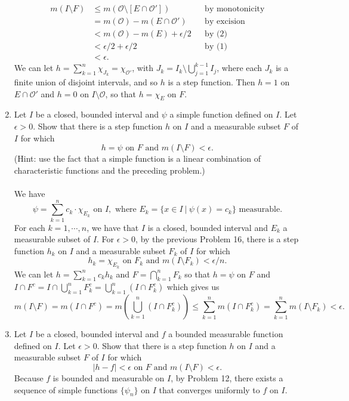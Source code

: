\begin{enumerate}
\begin{align*}
        m(I\setminus F)&\le m(\mathcal{O}\setminus[E\cap\mathcal{O}'])&&\text{by monotonicity}\\
        &=m(\mathcal{O})-m(E\cap\mathcal{O}')&&\text{by excision}\\
        &<m(\mathcal{O})-m(E)+\epsilon/2&&\text{by (2)}\\
        &<\epsilon/2+\epsilon/2&&\text{by (1)}\\\
        &<\epsilon.
    \end{align*}
    We can let $h=\sum_{k=1}^n \chi_{J_k}=\chi_{\mathcal{O}'}$, with $J_k=I_k\setminus\bigcup_{j=1}^{k-1}I_j$, where each $J_k$ is a finite union of disjoint intervals, and so $h$ is a step function.
    Then $h=1$ on $E\cap\mathcal{O}'$ and $h=0$ on $I\setminus\mathcal{O}$, so that $h=\chi_E$ on $F$.
    \item Let $I$ be a closed, bounded interval and $\psi$ a simple function defined on $I$. Let $\epsilon>0$.
    Show that there is a step function $h$ on $I$ and a measurable subset $F$ of $I$ for which 
    \[
        h=\psi\text{ on }F\text{ and }m(I\setminus F)<\epsilon.    
    \] 
    (Hint: use the fact that a simple function is a linear combination of characteristic functions and the preceding problem.)\\
    \\We have
    \[
        \psi=\sum_{k=1}^n c_k\cdot\chi_{E_k}\text{ on }I,\text{ where }E_k=\{x\in I\ |\ \psi(x)=c_k\}\text{ measurable}.  
    \]
    For each $k=1,\cdots,n$, we have that $I$ is a closed, bounded interval and $E_k$ a measurable subset of $I$.
    For $\epsilon>0$, by the previous Problem 16, there is a step function $h_k$ on $I$ and a measurable subset $F_k$ of $I$ for which 
    \[
        h_k=\chi_{E_k}\text{ on }F_k\text{ and }m(I\setminus F_k)<\epsilon/n.    
    \]
    We can let $h=\sum_{k=1}^n c_k h_k$ and $F=\bigcap_{k=1}^n F_k$ so that $h=\psi$ on $F$ and $I\cap F^c=I\cap \bigcup_{k=1}^n F_k^c=\bigcup_{k=1}^n (I\cap F_k^c)$ which gives us
    \[
        m(I\setminus F)=m(I\cap F^c)=m(\bigcup_{k=1}^n (I\cap F_k^c))\le \sum_{k=1}^n m(I\cap F_k^c)=\sum_{k=1}^n m(I\setminus F_k)<\epsilon.
    \]
    \item Let $I$ be a closed, bounded interval and $f$ a bounded measurable function defined on $I$. Let $\epsilon>0$.
    Show that there is a step function $h$ on $I$ and a measurable subset $F$ of $I$ for which 
    \[
        |h-f|<\epsilon\text{ on }F\text{ and }m(I\setminus F)<\epsilon.    
    \]
    Because $f$ is bounded and measurable on $I$, by Problem 12, there exists a sequence of simple functions $\{\psi_n\}$ on $I$ that converges uniformly to $f$ on $I$.

\end{enumerate}
